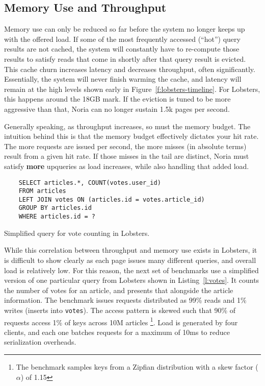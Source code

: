 \subsection{Memory Use and Throughput}

Memory use can only be reduced so far before the system no longer keeps up with
the offered load. If some of the most frequently accessed (``hot'') query
results are not cached, the system will constantly have to re-compute those
results to satisfy reads that come in shortly after that query result is
evicted. This cache churn increases latency and decreases throughput, often
significantly. Essentially, the system will never finish warming the cache, and
latency will remain at the high levels shown early in
Figure~\ref{f:lobsters-timeline}. For Lobsters, this happens around the 18GB
mark. If the eviction is tuned to be more aggressive than that, Noria can no
longer sustain 1.5k pages per second.

Generally speaking, as throughput increases, so must the memory budget. The
intuition behind this is that the memory budget effectively dictates your hit
rate. The more requests are issued per second, the more misses (in absolute
terms) result from a given hit rate. If those misses in the tail are
distinct, Noria must satisfy \textbf{more} upqueries as load increases, while
also handling that added load.

\begin{listing}[h]
  \begin{verbatim}
    SELECT articles.*, COUNT(votes.user_id)
    FROM articles
    LEFT JOIN votes ON (articles.id = votes.article_id)
    GROUP BY articles.id
    WHERE articles.id = ?
  \end{verbatim}
  \caption{Simplified query for vote counting in Lobsters.}
  \label{l:votes}
\end{listing}

While this correlation between throughput and memory use exists in Lobsters, it
is difficult to show clearly as each page issues many different queries, and
overall load is relatively low. For this reason, the next set of benchmarks use
a simplified version of one particular query from Lobsters shown in
Listing~\ref{l:votes}. It counts the number of votes for an article, and
presents that alongside the article information. The benchmark issues requests
distributed as 99\% reads and 1\% writes (inserts into \texttt{votes}). The
access pattern is skewed such that 90\% of requests access 1\% of keys across
10M articles%
\footnote{The benchmark samples keys from a Zipfian distribution with a skew
factor ($\alpha$) of 1.15}. Load is generated by four clients, and each one
batches requests for a maximum of 10ms to reduce serialization overheads.

